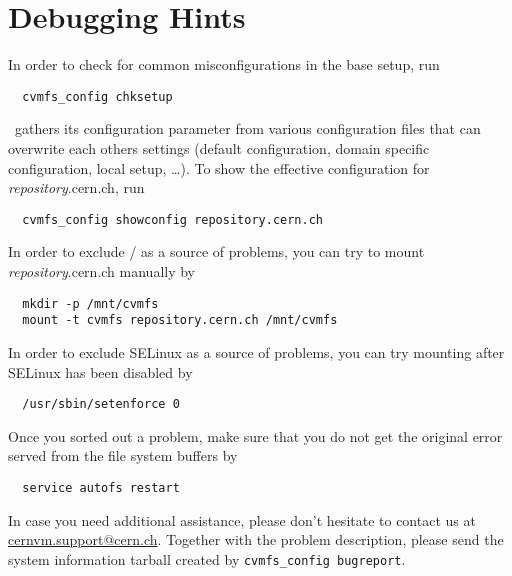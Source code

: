\section{Debugging Hints}
\label{sct:debugginghints}

In order to check for common misconfigurations in the base setup, run
\begin{verbatim}
  cvmfs_config chksetup
\end{verbatim}

\cvmfs\ gathers its configuration parameter from various configuration files that can overwrite each others settings (default configuration, domain specific configuration, local setup, \dots).  
To show the effective configuration for \emph{repository}.cern.ch, run
\begin{verbatim}
  cvmfs_config showconfig repository.cern.ch
\end{verbatim}

In order to exclude / as a source of problems, you can try to mount \emph{repository}.cern.ch manually by
\begin{verbatim}
  mkdir -p /mnt/cvmfs
  mount -t cvmfs repository.cern.ch /mnt/cvmfs
\end{verbatim}

In order to exclude SELinux as a source of problems, you can try mounting after SELinux has been disabled by
\begin{verbatim}
  /usr/sbin/setenforce 0
\end{verbatim}

Once you sorted out a problem, make sure that you do not get the original error served from the file system buffers by
\begin{verbatim}
  service autofs restart
\end{verbatim}

In case you need additional assistance, please don't hesitate to contact us at \url{cernvm.support@cern.ch}.
Together with the problem description, please send the system information tarball created by \texttt{cvmfs\_config bugreport}.
